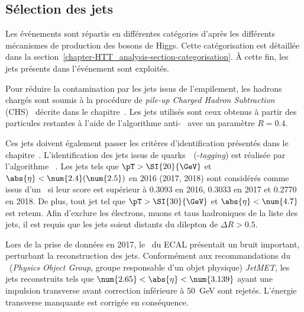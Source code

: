 \subsection{Sélection des jets}\label{chapter-HTT_analysis-section-jets}
Les événements sont répartis en différentes catégories d'après les différents mécanismes de production des bosons de Higgs.
Cette catégorisation est détaillée dans la section~\ref{chapter-HTT_analysis-section-categorisation}.
À cette fin, les jets présents dans l'événement sont exploités.
\par
Pour réduire la contamination par les jets issus de l'empilement, les hadrons chargés sont soumis à la procédure de \emph{pile-up Charged Hadron Subtraction} (CHS)~\cite{CMS-PAS-JME-14-001} décrite dans le chapitre~.
Les jets utilisés sont ceux obtenus à partir des particules restantes à l'aide de l'algorithme anti-\kT~\cite{Cacciari_antikT} avec un paramètre $R=\num{0.4}$.
\par
Ces jets doivent également passer les critères d'identification présentés dans le chapitre~.
L'identification des jets issus de quarks~\quarkb\ (\quarkb-\emph{tagging}) est réalisée par l'algorithme \DeepCSV~\cite{Sirunyan_heavy_flavor_jets_2018,DeepJet}.
Les jets tels que $\pT > \SI{20}{\GeV}$ et $\abs{\eta}<\num{2.4} (\num{2.5})$ en 2016 (2017, 2018) sont considérés comme issus d'un \quarkb\ si leur score est supérieur à \num{0.3093} en 2016, \num{0.3033} en 2017 et \num{0.2770} en 2018.
De plus, tout jet tel que $\pT > \SI{30}{\GeV}$ et $\abs{\eta}<\num{4.7}$ est retenu.
Afin d'exclure les électrons, muons et taus hadroniques de la liste des jets, il est requis que les jets soient distants du dilepton de $\Delta R > \num{0.5}$.
\par
Lors de la prise de données en 2017, le \CMSendcap\ du ECAL présentait un bruit important, perturbant la reconstruction des jets.
Conformément aux recommandations du \POG\ (\emph{Physics Object Group}, groupe responsable d'un objet physique) \emph{JetMET}, les jets reconstruits tels que $\num{2.65} < \abs{\eta} < \num{3.139}$ ayant une impulsion transverse avant correction inférieure à \SI{50}{\GeV} sont rejetés.
L'énergie transverse manquante est corrigée en conséquence.